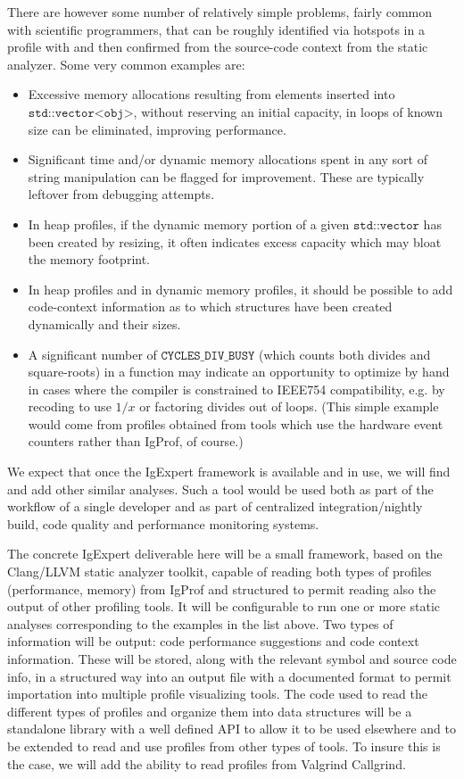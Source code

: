 \documentclass[notitlepage,letter,12pt]{article}
\begin{document}
There are however some number of relatively simple problems, fairly common 
with scientific programmers, that can be roughly identified via 
hotspots in a profile with and then confirmed from the source-code context 
from the static analyzer. Some very common examples are:

\begin{itemize}
\item Excessive memory allocations resulting from elements inserted into 
      $\texttt{std::vector<obj>}$, without reserving an initial capacity, 
      in loops of known size can be eliminated, improving performance.
\item Significant time and/or dynamic memory allocations spent in any sort of
string manipulation can be flagged for improvement. These are typically 
leftover from debugging attempts.
\item In heap profiles, if the dynamic memory portion of a given $\texttt{std::vector}$ has been created by resizing, it often indicates excess capacity 
which may bloat the memory footprint.
\item In heap profiles and in dynamic memory profiles, it should be
possible to add code-context information as to which structures have
been created dynamically and their sizes. 
\item A significant number of $\texttt{CYCLES\_DIV\_BUSY}$ (which counts
      both divides
      and square-roots) in a function may indicate an opportunity to 
      optimize by hand in cases where the compiler is constrained to
      IEEE754 compatibility, e.g. by recoding to use $1/x$ or factoring
      divides out of loops. (This simple example would come from profiles 
      obtained from tools which use the hardware event counters rather than 
      IgProf, of course.)
\end{itemize}

We expect that once the IgExpert framework is available and in use, we 
will find and add other similar analyses. Such a tool would be used both 
as part of the workflow of a single developer and as part of centralized 
integration/nightly build, code quality and performance monitoring systems.

The concrete IgExpert deliverable here will be a small framework, 
based on the Clang/LLVM static analyzer toolkit, capable of
reading both types of profiles (performance, memory) from IgProf and 
structured to permit reading also the output of other profiling tools.
It will be configurable to run one or more static analyses corresponding
to the examples in the list above. Two types of information will be
output: code performance suggestions and code context information. These 
will be stored, along with the relevant symbol and source code info, in a
structured way into an output file with a documented format to permit
importation into multiple profile visualizing tools. The code used
to read the different types of profiles and organize them into data
structures will be a standalone library with a well defined API to
allow it to be used elsewhere and to be extended to read and use profiles 
from other types of tools. To insure this is the case, we will add the
ability to read profiles from Valgrind Callgrind.
\end{document}
